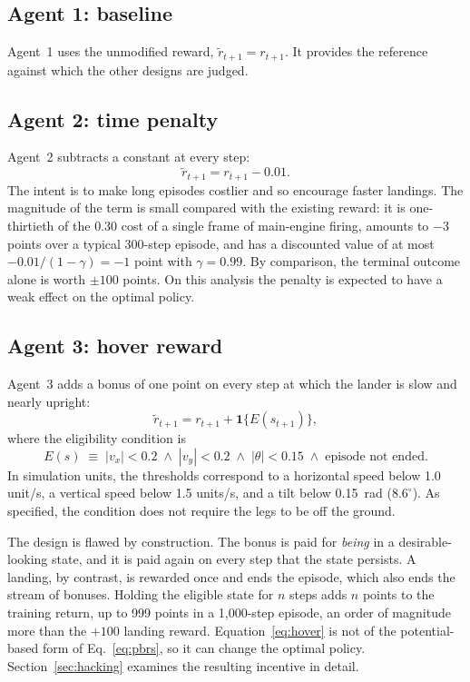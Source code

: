 \documentclass[11pt,a4paper]{article}
\begin{document}
\subsection{Agent 1: baseline}

Agent~1 uses the unmodified reward, $\tilde r_{t+1} = r_{t+1}$. It provides the reference against which the other designs are judged.

\subsection{Agent 2: time penalty}

Agent~2 subtracts a constant at every step:
\begin{equation}
  \tilde r_{t+1} = r_{t+1} - 0.01. \label{eq:timepen}
\end{equation}
The intent is to make long episodes costlier and so encourage faster landings. The magnitude of the term is small compared with the existing reward: it is one-thirtieth of the $0.30$ cost of a single frame of main-engine firing, amounts to $-3$ points over a typical 300-step episode, and has a discounted value of at most $-0.01/(1-\gamma) = -1$ point with $\gamma=0.99$. By comparison, the terminal outcome alone is worth $\pm100$ points. On this analysis the penalty is expected to have a weak effect on the optimal policy.

\subsection{Agent 3: hover reward}

Agent~3 adds a bonus of one point on every step at which the lander is slow and nearly upright:
\begin{equation}
  \tilde r_{t+1} = r_{t+1} + \mathbf{1}\{E(s_{t+1})\}, \label{eq:hover}
\end{equation}
where the eligibility condition is
\begin{equation}
  E(s) \;\equiv\; |v_x|<0.2 \;\wedge\; |v_y|<0.2 \;\wedge\; |\theta|<0.15 \;\wedge\; \text{episode not ended}. \label{eq:eligible}
\end{equation}
In simulation units, the thresholds correspond to a horizontal speed below 1.0 unit/s, a vertical speed below 1.5 units/s, and a tilt below 0.15~rad ($8.6^\circ$). As specified, the condition does not require the legs to be off the ground.

The design is flawed by construction. The bonus is paid for \emph{being} in a desirable-looking state, and it is paid again on every step that the state persists. A landing, by contrast, is rewarded once and ends the episode, which also ends the stream of bonuses. Holding the eligible state for $n$ steps adds $n$ points to the training return, up to 999 points in a 1{,}000-step episode, an order of magnitude more than the $+100$ landing reward. Equation~\eqref{eq:hover} is not of the potential-based form of Eq.~\eqref{eq:pbrs}, so it can change the optimal policy. Section~\ref{sec:hacking} examines the resulting incentive in detail.
\end{document}
